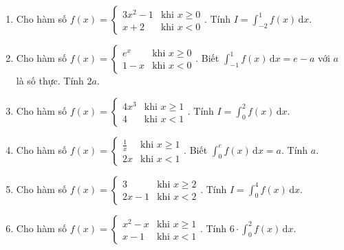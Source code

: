 \documentclass[12pt]{article}
\begin{document}
\begin{enumerate}[label=\textbf{Câu \arabic*.}]
		\item Cho hàm số $f(x) = \begin{cases} 3x^2 - 1 & \text{khi } x \ge 0 \\ x + 2 & \text{khi } x < 0 \end{cases}$. Tính $I = \displaystyle \int_{-2}^1 f(x)\,\mathrm{d}x$.
		\vspace{0.75cm}
		
		\item Cho hàm số $f(x) = \begin{cases} e^x & \text{khi } x \ge 0 \\ 1 - x & \text{khi } x < 0 \end{cases}$. Biết $\displaystyle \int_{-1}^1 f(x)\,\mathrm{d}x = e - a$ với $a$ là số thực. Tính $2a$.
		\vspace{0.75cm}
		
		\item Cho hàm số $f(x) = \begin{cases} 4x^3 & \text{khi } x \ge 1 \\ 4 & \text{khi } x < 1 \end{cases}$. Tính $I = \displaystyle \int_0^2 f(x)\,\mathrm{d}x$.
		\vspace{0.75cm}
		
		\item Cho hàm số $f(x) = \begin{cases} \frac{1}{x} & \text{khi } x \ge 1 \\ 2x & \text{khi } x < 1 \end{cases}$. Biết $\displaystyle \int_0^e f(x)\,\mathrm{d}x = a$. Tính $a$.
		\vspace{0.75cm}
		
		\item Cho hàm số $f(x) = \begin{cases} 3 & \text{khi } x \ge 2 \\ 2x - 1 & \text{khi } x < 2 \end{cases}$. Tính $I = \displaystyle \int_0^4 f(x)\,\mathrm{d}x$.
		\vspace{0.75cm}
		
		\item Cho hàm số $f(x) = \begin{cases} x^2 - x & \text{khi } x \ge 1 \\ x - 1 & \text{khi } x < 1 \end{cases}$. Tính $6 \cdot \displaystyle \int_0^2 f(x)\,\mathrm{d}x$.
		\vspace{0.75cm}
		

\end{enumerate}
\end{document}
